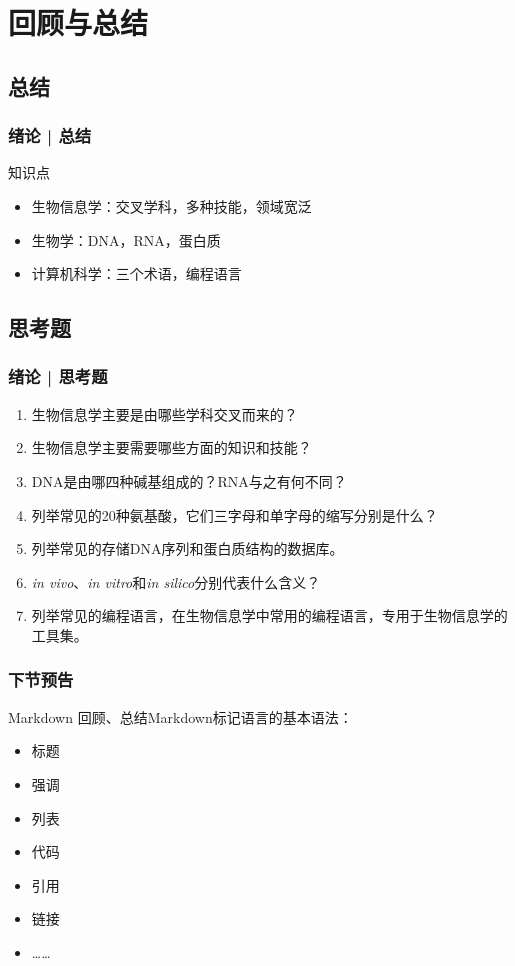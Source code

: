 \section{回顾与总结}
\subsection{总结}
\begin{frame}
  \frametitle{绪论 | 总结}
  \begin{block}{知识点}
    \begin{itemize}
      \item 生物信息学：交叉学科，多种技能，领域宽泛
      \item 生物学：DNA，RNA，蛋白质
      \item 计算机科学：三个术语，编程语言
    \end{itemize}
  \end{block}
\end{frame}

\subsection{思考题}
\begin{frame}
  \frametitle{绪论 | 思考题}
  \begin{enumerate}
    \item 生物信息学主要是由哪些学科交叉而来的？
    \item 生物信息学主要需要哪些方面的知识和技能？
    \item DNA是由哪四种碱基组成的？RNA与之有何不同？
    \item 列举常见的20种氨基酸，它们三字母和单字母的缩写分别是什么？
    \item 列举常见的存储DNA序列和蛋白质结构的数据库。
    \item \textit{in vivo}、\textit{in vitro}和\textit{in silico}分别代表什么含义？
    \item 列举常见的编程语言，在生物信息学中常用的编程语言，专用于生物信息学的工具集。
  \end{enumerate}
\end{frame}

\begin{frame}
  \frametitle{下节预告}
  \begin{block}{Markdown}
    回顾、总结Markdown标记语言的基本语法：
    \begin{itemize}
      \item 标题
      \item 强调
      \item 列表
      \item 代码
      \item 引用
      \item 链接
      \item ……
    \end{itemize}
  \end{block}
\end{frame}


